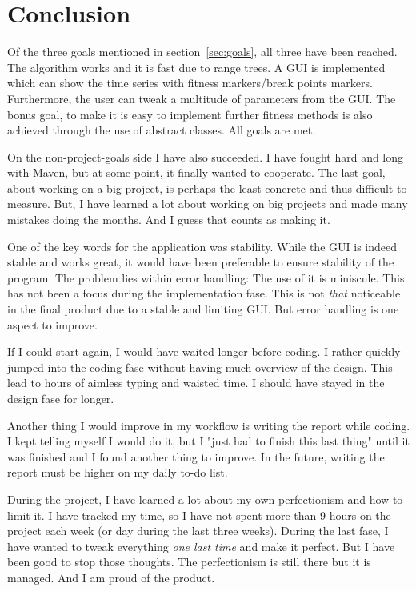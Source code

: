 
\section{Conclusion}

Of the three goals mentioned in section~\ref{sec:goals}, all three have been
reached. The algorithm works and it is fast due to range trees. A GUI is
implemented which can show the time series with fitness markers/break points
markers. Furthermore, the user can tweak a multitude of parameters from the GUI.
The bonus goal, to make it is easy to implement further fitness methods is also
achieved through the use of abstract classes. All goals are met. 

On the non-project-goals side I have also succeeded. I have fought hard and long
with Maven, but at some point, it finally wanted to cooperate. The last goal,
about working on a big project, is perhaps the least concrete and thus difficult to
measure. But, I have learned a lot about working on big projects and made many
mistakes doing the months. And I guess that counts as making it. 

One of the key words for the application was stability. While the GUI is indeed
stable and works great, it would have been preferable to ensure stability of the
program. The problem lies within error handling: The use of it is miniscule.
This has not been a focus during the implementation fase. This is not
\textit{that} noticeable in the final product due to a stable and limiting GUI.
But error handling is one aspect to improve. 

If I could start again, I would have waited longer before coding. I rather
quickly jumped into the coding fase without having much overview of the design.
This lead to hours of aimless typing and waisted time. I should have stayed in
the design fase for longer. 

Another thing I would improve in my workflow is writing the report while coding.
I kept telling myself I would do it, but I "just had to finish this last thing"
until it was finished and I found another thing to improve. In the future,
writing the report must be higher on my daily to-do list. 

During the project, I have learned a lot about my own perfectionism and how to
limit it. I have tracked my time, so I have not spent more than 9 hours on the
project each week (or day during the last three weeks). During the last fase, I
have wanted to tweak everything \textit{one last time} and make it perfect. But
I have been good to stop those thoughts. The perfectionism is still there but it
is managed. And I am proud of the product. 